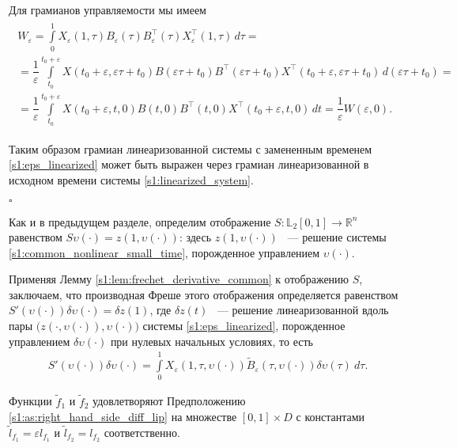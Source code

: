 \documentclass[../main.tex]{subfiles}
\begin{document}
Для грамианов управляемости мы имеем
\begin{gather*}
\begin{gathered}
    W_{\varepsilon} =
        \int\limits_0^1
        X_{ \varepsilon} (1,\tau)
        B_{\varepsilon}(\tau)
        B_{\varepsilon}^{\top}(\tau)
        X_{ \varepsilon}^{\top} (1,\tau) \, d\tau = \\
        = \dfrac{1}{\varepsilon} \int\limits_{t_0}^{t_0+\varepsilon}
        X(t_0+\varepsilon,\varepsilon \tau + t_0)
        B(\varepsilon \tau + t_0)
        B^{\top}(\varepsilon \tau + t_0)
        X^{\top}(t_0+\varepsilon,\varepsilon \tau + t_0) \,
        d\left( \varepsilon\tau + t_0\right) = \\ =
        \dfrac{1}{\varepsilon} \int\limits_{t_0}^{t_0+\varepsilon}
        X(t_0+\varepsilon,t, 0)
        B(t, 0)
        B^{\top}(t, 0)
        X^{\top}(t_0+\varepsilon,t, 0) \, dt = \dfrac{1}{\varepsilon} W(\varepsilon, 0). 
\end{gathered}
\end{gather*}

Таким образом грамиан линеаризованной системы с замененным временем \eqref{s1:eps_linearized} может быть выражен через грамиан линеаризованной в исходном времени системы \eqref{s1:linearized_system}.  

\hfill $\square$
        
Как и в предыдущем разделе, определим отображение $S: \mathbb{L}_2[0,1] \rightarrow \mathbb{R}^n $ равенством $S\upsilon(\cdot) = z(1,\upsilon(\cdot))$: здесь $ z(1,\upsilon(\cdot))$ ~--- решение системы \eqref{s1:common_nonlinear_small_time}, порожденное управлением $\upsilon(\cdot)$. 
 
Применяя Лемму \ref{s1:lem:frechet_derivative_common} к отображению $S$, заключаем, что производная Фреше этого отображения определяется равенством $ S'(\upsilon(\cdot))\delta \upsilon(\cdot) = \delta z(1)$, где $\delta z(t)$ ~--- решение линеаризованной вдоль пары $\big( z(\cdot,\upsilon(\cdot)),\upsilon(\cdot)\big)  $ системы \eqref{s1:eps_linearized}, порожденное управлением $\delta \upsilon(\cdot)$ при нулевых начальных условиях, то есть
\begin{gather*}
	S'(\upsilon(\cdot))\delta \upsilon(\cdot) = \int\limits_0^1  X_{\varepsilon}(1, \tau, \upsilon(\cdot)) \widetilde{B}_{\varepsilon}(\tau, \upsilon(\cdot))  \delta\upsilon(\tau)\ d\tau. 
\end{gather*}
 
Функции  $\widetilde{f}_1$ и $\widetilde{f}_2$ удовлетворяют Предположению \ref{s1:as:right_hand_side_diff_lip} на множестве $[0, 1]\times D$ с константами $\widetilde{l}_{f_1} = \varepsilon l_{f_1} $ и  $\widetilde{l}_{f_2} = l_{f_2} $ соответственно. 
\end{document}
